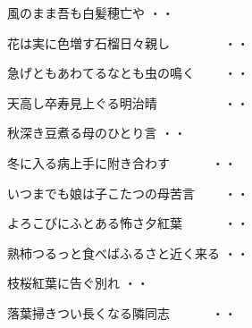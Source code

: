 \vspace{0.4cm}
\begin{shiika}風のまま吾も白髪穂亡や
\hfill{・・}\end{shiika}
\vspace{0.4cm}
\begin{shiika}花は実に色増す石榴日々親し　　　　
\hfill{・・}\end{shiika}
\vspace{0.4cm}
\begin{shiika}急げともあわてるなとも虫の鳴く　　
\hfill{・・}\end{shiika}
\vspace{0.4cm}
\begin{shiika}天高し卒寿見上ぐる明治晴　　　　　
\hfill{・・}\end{shiika}
\vspace{0.4cm}
\begin{shiika}秋深き豆煮る母のひとり言
\hfill{・・}\end{shiika}
\vspace{0.4cm}
\begin{shiika}冬に入る病上手に附き合わす　　　
\hfill{・・}\end{shiika}
\vspace{0.4cm}
\begin{shiika}いつまでも娘は子こたつの母苦言　　
\hfill{・・}\end{shiika}
\vspace{0.4cm}
\begin{shiika}よろこびにふとある怖さ夕紅葉　　　
\hfill{・・}\end{shiika}
\vspace{0.4cm}
\begin{shiika}熟柿つるっと食べばふるさと近く来る
\hfill{・・}\end{shiika}
\vspace{0.4cm}
\begin{shiika}枝桜紅葉に告ぐ別れ
\hfill{・・}\end{shiika}
\vspace{0.4cm}
\begin{shiika}落葉掃きつい長くなる隣同志　　　
\hfill{・・}\end{shiika}
